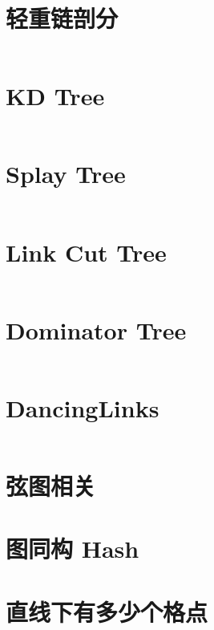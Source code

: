\documentclass[titlepage,landscape,a4paper,10pt]{article}
\begin{document}
\begin{multicols}{2}
\begin{spacing}{0.8}
\section{轻重链剖分}
\inputminted{cpp}{src/轻重链剖分.cpp}

\section{KD Tree}
\inputminted{cpp}{src/KDTree.cpp}

\section{Splay Tree}
\inputminted{cpp}{src/Splay.cpp}

\section{Link Cut Tree}
\inputminted{cpp}{improve/LCT.cpp}

\section{Dominator Tree}
\inputminted{cpp}{improve/DominatorTree.cpp}

\section{DancingLinks}
\inputminted{cpp}{src/DancingLinks.cpp}
%

\section{弦图相关}


\section{图同构 Hash}



\section{直线下有多少个格点}
\inputminted{cpp}{src/直线下格点统计.cpp}


\end{spacing}
\end{multicols}
\end{document}
